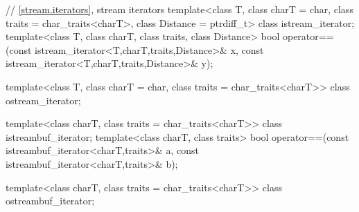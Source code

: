 \begin{codeblock}
{  // \ref{stream.iterators}, stream iterators
  template<class T, class charT = char, class traits = char_traits<charT>,
           class Distance = ptrdiff_t>
  class istream_iterator;
  template<class T, class charT, class traits, class Distance>
    bool operator==(const istream_iterator<T,charT,traits,Distance>& x,
                    const istream_iterator<T,charT,traits,Distance>& y);

  template<class T, class charT = char, class traits = char_traits<charT>>
    class ostream_iterator;

  template<class charT, class traits = char_traits<charT>>
    class istreambuf_iterator;
  template<class charT, class traits>
    bool operator==(const istreambuf_iterator<charT,traits>& a,
                    const istreambuf_iterator<charT,traits>& b);

  template<class charT, class traits = char_traits<charT>>
    class ostreambuf_iterator;

}
\end{codeblock}
